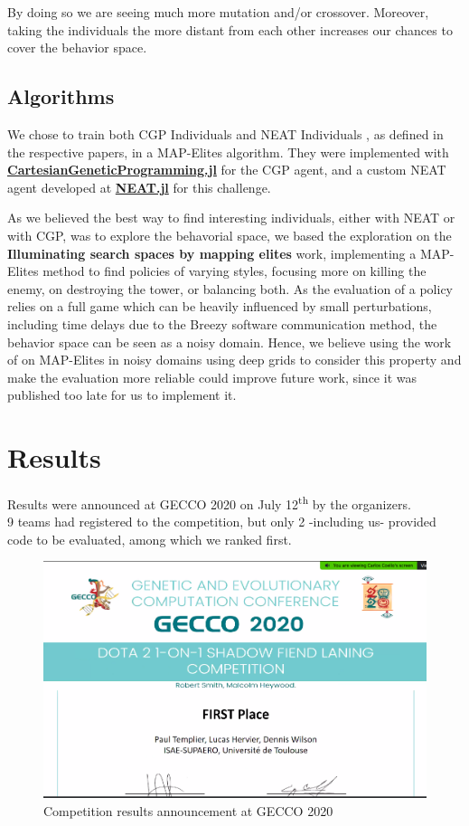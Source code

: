 By doing so we are seeing much more mutation and/or crossover. Moreover, taking the individuals the more distant from each other increases our chances to cover the behavior space.

\subsection{Algorithms}
We chose to train both CGP Individuals  \cite{CGP} and NEAT Individuals \cite{NEAT_1}, as defined in the respective papers, in a MAP-Elites algorithm. They were implemented with \href{https://github.com/d9w/CartesianGeneticProgramming.jl}{\textbf{CartesianGeneticProgramming.jl}} for the CGP agent, and a custom NEAT agent developed at \href{https://github.com/d9w/NEAT.jl}{\textbf{NEAT.jl}} for this challenge.

As we believed the best way to find interesting individuals, either with NEAT or with CGP, was to explore the behavorial space, we based the exploration on the \textbf{Illuminating search spaces by mapping elites} \cite{MapElites} work, implementing a MAP-Elites method to find policies of varying styles, focusing more on killing the enemy, on destroying the tower, or balancing both. 
As the evaluation of a policy relies on a full game which can be heavily influenced by small perturbations, including time delays due to the Breezy software communication method, the behavior space can be seen as a noisy domain. Hence, we believe using the work of \cite{noisy-map-elites} on MAP-Elites in noisy domains using deep grids to consider this property and  make the evaluation more reliable could improve future work, since it was published too late for us to implement it. 

\section{Results}

Results were announced at GECCO 2020 on July 12\textsuperscript{th} by the organizers. \\
9 teams had registered to the competition, but only 2 -including us- provided code to be evaluated, among which we ranked first. \\

\begin{figure}[H]
\centering
\includegraphics[width=12cm]{images/breezy-win.png}
\caption{Competition results announcement at GECCO 2020}
\end{figure}

